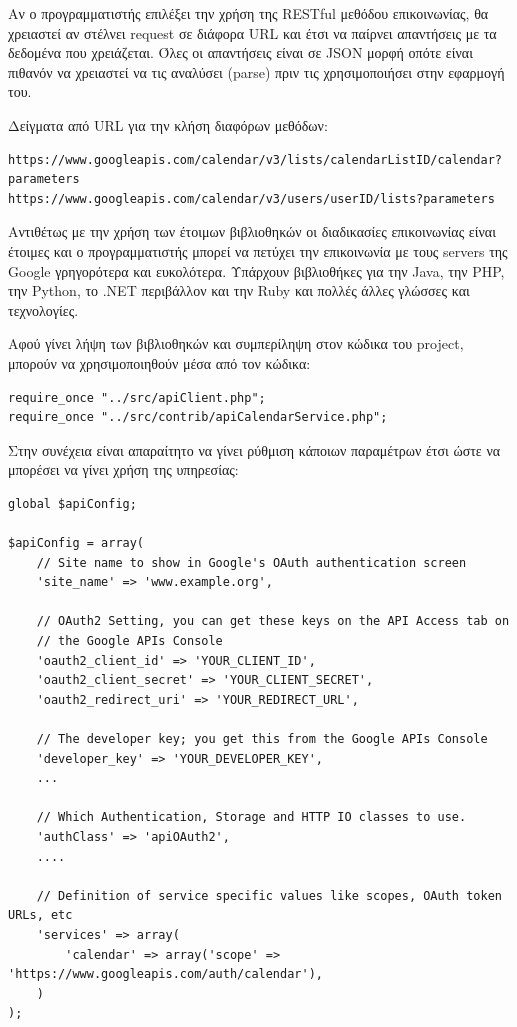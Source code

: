 Αν ο προγραμματιστής επιλέξει την χρήση της RESTful μεθόδου επικοινωνίας, θα χρειαστεί αν στέλνει request σε διάφορα URL και έτσι να παίρνει απαντήσεις με τα δεδομένα που χρειάζεται. Όλες οι απαντήσεις είναι σε JSON μορφή οπότε είναι πιθανόν να χρειαστεί να τις αναλύσει (parse) πριν τις χρησιμοποιήσει στην εφαρμογή του. 

Δείγματα από URL για την κλήση διαφόρων μεθόδων: 

\begin{lstlisting}[breaklines=true]
https://www.googleapis.com/calendar/v3/lists/calendarListID/calendar?parameters
https://www.googleapis.com/calendar/v3/users/userID/lists?parameters
\end{lstlisting}

Αντιθέτως με την χρήση των έτοιμων βιβλιοθηκών οι διαδικασίες επικοινωνίας είναι έτοιμες και ο προγραμματιστής μπορεί να πετύχει την επικοινωνία με τους servers της Google γρηγορότερα και ευκολότερα. 
Υπάρχουν βιβλιοθήκες για την Java, την PHP, την Python, το .NET περιβάλλον και την Ruby και πολλές άλλες γλώσσες και τεχνολογίες. 

Αφού γίνει λήψη των βιβλιοθηκών και συμπερίληψη στον κώδικα του project, μπορούν να χρησιμοποιηθούν μέσα από τον κώδικα:

\begin{lstlisting}
require_once "../src/apiClient.php";
require_once "../src/contrib/apiCalendarService.php";
\end{lstlisting}

Στην συνέχεια είναι απαραίτητο να γίνει ρύθμιση κάποιων παραμέτρων έτσι ώστε να μπορέσει να γίνει χρήση της υπηρεσίας:

\begin{lstlisting}[breaklines=true]
global $apiConfig;

$apiConfig = array(
    // Site name to show in Google's OAuth authentication screen
    'site_name' => 'www.example.org',

    // OAuth2 Setting, you can get these keys on the API Access tab on
    // the Google APIs Console
    'oauth2_client_id' => 'YOUR_CLIENT_ID',
    'oauth2_client_secret' => 'YOUR_CLIENT_SECRET',
    'oauth2_redirect_uri' => 'YOUR_REDIRECT_URL',

    // The developer key; you get this from the Google APIs Console
    'developer_key' => 'YOUR_DEVELOPER_KEY',
    ...

    // Which Authentication, Storage and HTTP IO classes to use.
    'authClass' => 'apiOAuth2',
    ....

    // Definition of service specific values like scopes, OAuth token URLs, etc
    'services' => array(
        'calendar' => array('scope' => 'https://www.googleapis.com/auth/calendar'),
    )
);
\end{lstlisting}

